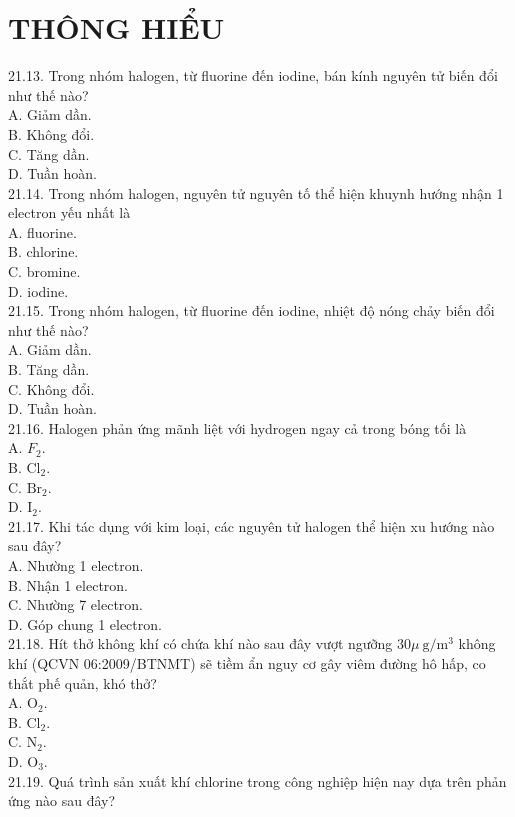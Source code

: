 \documentclass[10pt]{article}
\begin{document}
\section*{THÔNG HIỂU}
21.13. Trong nhóm halogen, từ fluorine đến iodine, bán kính nguyên tử biến đổi như thế nào?\\
A. Giảm dần.\\
B. Không đổi.\\
C. Tăng dần.\\
D. Tuần hoàn.\\
21.14. Trong nhóm halogen, nguyên tử nguyên tố thể hiện khuynh hướng nhận 1 electron yếu nhất là\\
A. fluorine.\\
B. chlorine.\\
C. bromine.\\
D. iodine.\\
21.15. Trong nhóm halogen, từ fluorine đến iodine, nhiệt độ nóng chảy biến đổi như thế nào?\\
A. Giảm dần.\\
B. Tăng dần.\\
C. Không đổi.\\
D. Tuần hoàn.\\
21.16. Halogen phản ứng mãnh liệt với hydrogen ngay cả trong bóng tối là\\
A. $F_{2}$.\\
B. $\mathrm{Cl}_{2}$.\\
C. $\mathrm{Br}_{2}$.\\
D. $\mathrm{I}_{2}$.\\
21.17. Khi tác dụng với kim loại, các nguyên tử halogen thể hiện xu hướng nào sau đây?\\
A. Nhường 1 electron.\\
B. Nhận 1 electron.\\
C. Nhường 7 electron.\\
D. Góp chung 1 electron.\\
21.18. Hít thở không khí có chứa khí nào sau đây vượt ngưỡng $30 \mu \mathrm{~g} / \mathrm{m}^{3}$ không khí (QCVN 06:2009/BTNMT) sẽ tiềm ẩn nguy cơ gây viêm đường hô hấp, co thắt phế quản, khó thở?\\
A. $\mathrm{O}_{2}$.\\
B. $\mathrm{Cl}_{2}$.\\
C. $\mathrm{N}_{2}$.\\
D. $\mathrm{O}_{3}$.\\
21.19. Quá trình sản xuất khí chlorine trong công nghiệp hiện nay dựa trên phản ứng nào sau đây?\\
\end{document}
